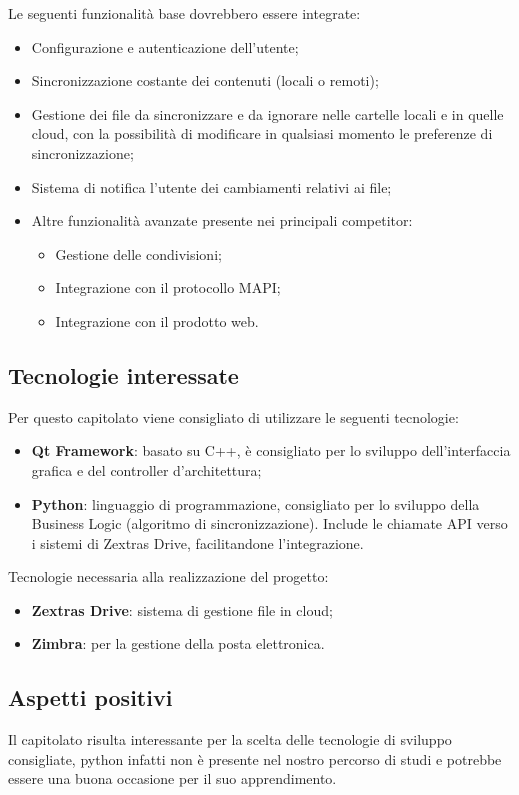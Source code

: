 \documentclass[../studio-di-fattibilita.tex]{subfiles}
\begin{document}
Le seguenti funzionalità base dovrebbero essere integrate:
\begin{itemize}
  \item Configurazione e autenticazione dell’utente;
  \item Sincronizzazione costante dei contenuti (locali o remoti);
  \item Gestione dei file da sincronizzare e da ignorare nelle cartelle locali e in quelle cloud, con la possibilità di modificare in qualsiasi momento le preferenze di sincronizzazione;
  \item Sistema di notifica l’utente dei cambiamenti relativi ai file; 
  \item Altre funzionalità avanzate presente nei principali competitor:
  \begin{itemize}
    \item Gestione delle condivisioni;
    \item Integrazione con il protocollo MAPI;
    \item Integrazione con il prodotto web.
  \end{itemize}
\end{itemize}

\subsection{Tecnologie interessate}%
\label{sub:tecnologie_interessate}
Per questo capitolato viene consigliato di utilizzare le seguenti tecnologie:
\begin{itemize}
  \item \textbf{Qt Framework}: basato su C++, è consigliato per lo sviluppo dell’interfaccia grafica e del controller d’architettura;
  \item \textbf{Python}: linguaggio di programmazione, consigliato per lo sviluppo della Business Logic (algoritmo di sincronizzazione). Include le chiamate API verso i sistemi di Zextras Drive, facilitandone l’integrazione.
\end{itemize}

Tecnologie necessaria alla realizzazione del progetto:
\begin{itemize}
  \item \textbf{Zextras Drive}: sistema di gestione file in cloud;
  \item \textbf{Zimbra}:  per la gestione della posta elettronica.
\end{itemize}

\subsection{Aspetti positivi}%
\label{sub:aspetti_positivi}
Il capitolato risulta interessante per la scelta delle tecnologie di sviluppo consigliate, python infatti non è presente nel nostro percorso di studi e potrebbe essere una buona occasione per il suo apprendimento.
\end{document}
